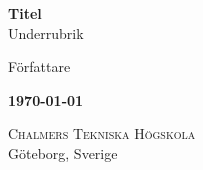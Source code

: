 \begin{titlepage}
			
\addtolength{\voffset}{2cm}

\renewcommand{\familydefault}{\sfdefault} \normalfont

\textbf{{\Huge Titel}} \\[0.5cm]
{\Large Underrubrik}
\setlength{\parskip}{1cm}

{\Large
    Författare \\ [0.2cm]
} \setlength{\parskip}{2.9cm}


\textbf{\today}

\mbox{}
\vfill

\textsc{Chalmers Tekniska Högskola} \\
Göteborg, Sverige \the\year

\renewcommand{\familydefault}{\rmdefault} \normalfont %
\end{titlepage}

\newpage
\tableofcontents
